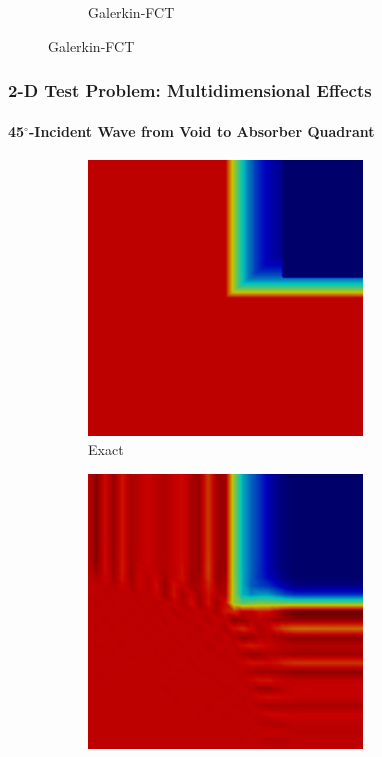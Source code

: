 \documentclass{beamer} \useoutertheme{infolines}
\begin{document}
\begin{frame}
\begin{figure}[h]
\begin{subfigure}{0.45\textwidth}
      \caption{Galerkin-FCT}
   \end{subfigure}
\end{figure}

\end{frame}
\begin{frame}
\frametitle{2-D Test Problem: Multidimensional Effects}
\framesubtitle{45$^{\circ}$-Incident Wave from Void to Absorber Quadrant}

\begin{figure}[h]
   \centering
   \begin{subfigure}{0.3\textwidth}
      \includegraphics[width=0.8\textwidth]{./figures/skew_exact.png}
      \caption{Exact}
   \end{subfigure}
   \begin{subfigure}{0.3\textwidth}
      \includegraphics[width=0.8\textwidth]{./figures/skew_Gal.png}

\end{subfigure}
\end{figure}
\end{frame}
\end{document}
